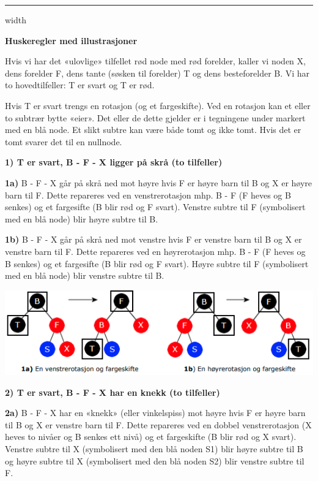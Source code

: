 \documentclass[11pt]{article}
\begin{document}
        \hrule width \textwidth

        \textbf{Huskeregler med illustrasjoner}

        Hvis vi har det «ulovlige» tilfellet rød node med rød forelder, kaller vi noden X, dens forelder
        F, dens tante (søsken til forelder) T og dens besteforelder B. Vi har to hovedtilfeller: T er
        svart og T er rød.

        Hvis T er svart trengs en rotasjon (og et fargeskifte). Ved en rotasjon kan et eller to subtrær
        bytte «eier». Det eller de dette gjelder er i tegningene under markert med en blå node. Et
        slikt subtre kan være både tomt og ikke tomt. Hvis det er tomt svarer det til en nullnode.

        \textbf{1) T er svart, B - F - X ligger på skrå (to tilfeller)}

        \textbf{1a)}
        B - F - X går på skrå ned mot høyre hvis F er høyre barn til B og X er høyre barn til F.
        Dette repareres ved en venstrerotasjon mhp. B - F (F heves og B senkes) og et fargesifte (B
        blir rød og F svart). Venstre subtre til F (symbolisert med en blå node) blir høyre subtre til B.

        \textbf{1b)}
        B - F - X går på skrå ned mot venstre hvis F er venstre barn til B og X er venstre barn til
        F. Dette repareres ved en høyrerotasjon mhp. B - F (F heves og B senkes) og et fargesifte (B
        blir rød og F svart). Høyre subtre til F (symbolisert med en blå node) blir venstre subtre til B.

        \includegraphics[center]{f-9.2.5-1ab.png}



        \textbf{2) T er svart, B - F - X har en knekk (to tilfeller)}

        \textbf{2a)}
        B - F - X har en «knekk» (eller vinkelspiss) mot høyre hvis F er høyre barn til B og X er
        venstre barn til F. Dette repareres ved en dobbel venstrerotasjon (X heves to nivåer og B
        senkes ett nivå) og et fargeskifte (B blir rød og X svart). Venstre subtre til X (symbolisert
        med den blå noden S1) blir høyre subtre til B og høyre subtre til X (symbolisert med den blå
        noden S2) blir venstre subtre til F.
\end{document}
